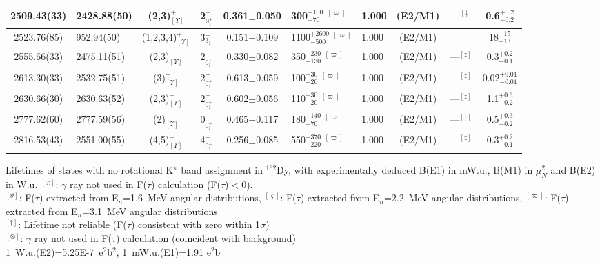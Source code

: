 \begin{landscape}
\begin{center}
\begin{longtable}{clcccllccc}
 2509.43(33)& 2428.88(50) & (2,3)$^+_{[\Upsilon]}$   & 2$^+_{0^+_1}$ &0.361$\pm$0.050& 300$^{+100}_{-70}$      $^{[\varpi]}$               &1.000                &(E2/M1)& ---$^{[\ddagger]}$                       & 0.6$^{+0.2}_{-0.2}$    \\ \hline
 2523.76(85)&  952.94(50) & (1,2,3,4)$^\pm_{[\Upsilon]}$     & 3$^-_{3^-_1}$ &0.151$\pm$0.109& 1100$^{+2600}_{-500}$   $^{[\varpi]}$       &1.000                &(E2/M1)&                                          & 18$^{+15}_{-13}$          \\ \hline 
 2555.66(33)& 2475.11(51) & (2,3)$^+_{[\Upsilon]}$   & 2$^+_{0^+_1}$ &0.330$\pm$0.082& 350$^{+230}_{-130}$     $^{[\varpi]}$               &1.000                &(E2/M1)& ---$^{[\ddagger]}$                       & 0.3$^{+0.2}_{-0.1}$   \\ \hline
 2613.30(33)& 2532.75(51) & (3)$^+_{[\Upsilon]}$     & 2$^+_{0^+_1}$ &0.613$\pm$0.059& 100$^{+30}_{-20}$       $^{[\varpi]}$               &1.000                &(E2/M1)& ---$^{[\ddagger]}$                       & 0.02$^{+0.01}_{-0.01}$    \\ \hline
 2630.66(30)& 2630.63(52) & (2,3)$^+_{[\Upsilon]}$   & 2$^+_{0^+_1}$ &0.602$\pm$0.056& 110$^{+30}_{-20}$       $^{[\varpi]}$               &1.000                &(E2/M1)& ---$^{[\ddagger]}$                       & 1.1$^{+0.3}_{-0.2}$      \\ \hline
 2777.62(60)& 2777.59(56) & (2)$^+_{[\Upsilon]}$     & 0$^+_{0^+_1}$ &0.465$\pm$0.117& 180$^{+140}_{-70}$      $^{[\varpi]}$               &1.000                &(E2/M1)& ---$^{[\ddagger]}$                       & 0.5$^{+0.3}_{-0.2}$      \\ \hline
 2816.53(43)& 2551.00(55) & (4,5)$^+_{[\Upsilon]}$   & 4$^+_{0^+_1}$ &0.256$\pm$0.085& 550$^{+370}_{-220}$     $^{[\varpi]}$               &1.000                &(E2/M1)& ---$^{[\ddagger]}$                       & 0.3$^{+0.2}_{-0.1}$   \\

\end{longtable}
\end{center}  
Lifetimes of states with no rotational K$^\pi$ band assignment in $^{162}$Dy, with experimentally deduced B(E1) in mW.u., B(M1) in $\mu_N^2$ and B(E2) in W.u.
{\small $^{[\oslash]}$: $\gamma$ ray not used in F($\tau$) calculation (F($\tau$)$<$0).}\\
{\small $^{[\vartheta]}$: F($\tau$) extracted from E$_n$=1.6~MeV angular distributions},
{\small $^{[\varsigma]}$: F($\tau$) extracted from E$_n$=2.2~MeV angular distributions},
{\small $^{[\varpi]}$: F($\tau$) extracted from E$_n$=3.1~MeV angular distributions}\\
{\small $^{[\dagger]}$: Lifetime not reliable (F($\tau$) consistent with zero within 1$\sigma$)}\\
{\small $^{[\otimes]}$: $\gamma$ ray not used in F($\tau$) calculation (coincident with background)}\\
{\small 1~W.u.(E2)=5.25E-7~e$^2$b$^2$, 1~mW.u.(E1)=1.91 e$^2$b}


\end{landscape}

